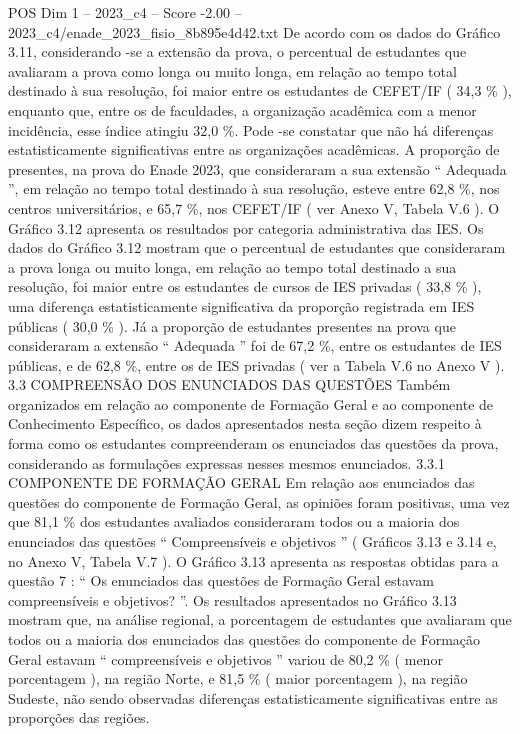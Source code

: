 \begin{textsample}{POS Dim 1 – 2023\_c4 – Score -2.00 – 2023\_c4/enade\_2023\_fisio\_8b895e4d42.txt}
De acordo com os dados do Gráfico 3.11, considerando -se a extensão da prova, o percentual de estudantes que avaliaram a prova como longa ou muito longa, em relação ao tempo total destinado à sua resolução, foi maior entre os estudantes de CEFET/IF ( 34,3 \% ), enquanto que, entre os de faculdades, a organização acadêmica com a menor incidência, esse índice atingiu 32,0 \%.
Pode -se constatar que não há diferenças estatisticamente significativas entre as organizações acadêmicas.
A proporção de presentes, na prova do Enade 2023, que consideraram a sua extensão “ Adequada ”, em relação ao tempo total destinado à sua resolução, esteve entre 62,8 \%, nos centros universitários, e 65,7 \%, nos CEFET/IF ( ver Anexo V, Tabela V.6 ).
O Gráfico 3.12 apresenta os resultados por categoria administrativa das IES.
Os dados do Gráfico 3.12 mostram que o percentual de estudantes que consideraram a prova longa ou muito longa, em relação ao tempo total destinado a sua resolução, foi maior entre os estudantes de cursos de IES privadas ( 33,8 \% ), uma diferença estatisticamente significativa da proporção registrada em IES públicas ( 30,0 \% ).
Já a proporção de estudantes presentes na prova que consideraram a extensão “ Adequada ” foi de 67,2 \%, entre os estudantes de IES públicas, e de 62,8 \%, entre os de IES privadas ( ver a Tabela V.6 no Anexo V ). 3.3 COMPREENSÃO DOS ENUNCIADOS DAS QUESTÕES Também organizados em relação ao componente de Formação Geral e ao componente de Conhecimento Específico, os dados apresentados nesta seção dizem respeito à forma como os estudantes compreenderam os enunciados das questões da prova, considerando as formulações expressas nesses mesmos enunciados. 3.3.1 COMPONENTE DE FORMAÇÃO GERAL Em relação aos enunciados das questões do componente de Formação Geral, as opiniões foram positivas, uma vez que 81,1 \% dos estudantes avaliados consideraram todos ou a maioria dos enunciados das questões “ Compreensíveis e objetivos ” ( Gráficos 3.13 e 3.14 e, no Anexo V, Tabela V.7 ).
O Gráfico 3.13 apresenta as respostas obtidas para a questão 7 : “ Os enunciados das questões de Formação Geral estavam compreensíveis e objetivos? ”.
Os resultados apresentados no Gráfico 3.13 mostram que, na análise regional, a porcentagem de estudantes que avaliaram que todos ou a maioria dos enunciados das questões do componente de Formação Geral estavam “ compreensíveis e objetivos ” variou de 80,2 \% ( menor porcentagem ), na região Norte, e 81,5 \% ( maior porcentagem ), na região Sudeste, não sendo observadas diferenças estatisticamente significativas entre as proporções das regiões.

\end{textsample}
